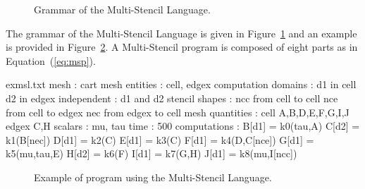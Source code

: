 \begin{figure}[hbt]
  \hspace{5mm}
  \begin{minipage}[!h]{0.98\textwidth}
    {}   
    \caption{Grammar of the Multi-Stencil Language. \label{fig:grammar}}
  \end{minipage}
\end{figure}

The grammar of the Multi-Stencil Language is given in Figure~\ref{fig:grammar} and an example is provided in Figure~\ref{fig:exmsl}. A Multi-Stencil program is composed of eight parts as in Equation~(\ref{eq:msp}).

\begin{filecontents*}{exmsl.txt}
mesh : cart
mesh entities : cell, edgex
computation domains :
  d1 in cell
  d2 in edgex
independent :
  d1 and d2
stencil shapes : 
  ncc from cell to cell
  nce from cell to edgex
  nec from edgex to cell
mesh quantities :
  cell A,B,D,E,F,G,I,J
  edgex C,H
scalars : mu, tau
time : 500
computations :
  B[d1] = k0(tau,A)
  C[d2] = k1(B[nec])
  D[d1] = k2(C)
  E[d1] = k3(C)
  F[d1] = k4(D,C[nce])
  G[d1] = k5(mu,tau,E)
  H[d2] = k6(F)
  I[d1] = k7(G,H)
  J[d1] = k8(mu,I[ncc])
\end{filecontents*}

\begin{figure}[!h]
  \hspace{5mm}
  \begin{minipage}[!h]{0.98\textwidth}
    {}   
    \caption{Example of program using the Multi-Stencil Language. \label{fig:exmsl}}
  \end{minipage}
\end{figure}

